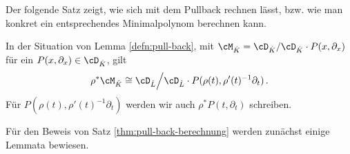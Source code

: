 Der folgende Satz zeigt, wie sich mit dem Pullback rechnen lässt, bzw.
wie man konkret ein entsprechendes Minimalpolynom berechnen kann.
\begin{thm} \label{thm:pull-back-berechnung}
In der Situation von Lemma \ref{defn:pull-back}, mit
$\cM_{\hat K}=\cD_{\hat K}/\cD_{\hat K}\cdot P(x,\partial_x)$ für ein
$P(x,\partial_x)\in\cD_{\hat K}$, gilt
\[\rho^*\cM_{\hat K}\cong \cD_{\hat L}\Big/\cD_{\hat L}\cdot
  P(\rho(t),\rho'(t)^{-1}\partial_t) \,. \]
Für $P(\rho(t),\rho'(t)^{-1}\partial_t)$ werden wir auch
$\rho^*P(t,\partial_t)$ schreiben.
\end{thm}
\begin{comment}
\cite[Seite 130]{coutinho1995primer} Holonomic modules are preserved under
this construction.
\end{comment}
%
\begin{comment}
\cite[Page 34]{sabbah_cimpa90}
Sei $\cM_{\hat K}$ ein formaler meromorpher Zusammenhang. Man definiert
$\pi^*\cM_{\hat K}$ als den Vektor Raum über $\hat L:\pi^*\cM_{\hat K}=\hat
L\otimes_{\hat K}\cM_{\hat K}$. Dann definiert man die Wirkung von $\partial_t$
durch: $t\partial_t\cdot(1\otimes m)=q(1\otimes(x\partial_x\otimes m))$ und
damit
\[
t\partial_t\cdot(\phi\otimes m)=q(\phi\otimes(x\partial_x\cdot
m))+((t\frac{\partial\phi}{\partial t})\otimes m) \,.
\]
Man erhält damit die Wirkung von $\partial_t=t^{-1}(t\partial_t)$.
\end{comment}

Für den Beweis von Satz \ref{thm:pull-back-berechnung} werden zunächst einige
Lemmata bewiesen.

